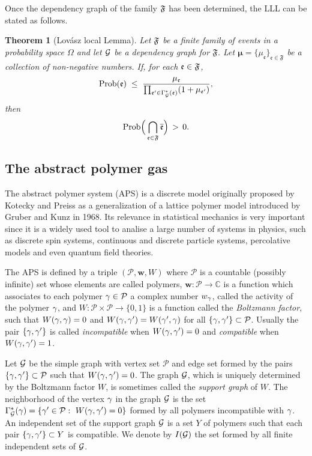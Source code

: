 \documentclass[11pt]{article}
\newtheorem{theo}{Theorem}[section]
\let\m=\mu \let\n=\nu \let\o=\omega    \let\p=\pi \let\ph=\varphi
\let\\=\noindent
\def\ee{\end{equation}}
\def\be{\begin{equation}}
\let\m=\mu \let\n=\nu \let\o=\omega    \let\p=\pi \let\ph=\varphi
\let\\=\noindent
\def\ee{\end{equation}}
\def\be{\begin{equation}}
\def\prob{{\rm Prob}}
\def\ev{{\mathfrak{e}}}
\def\PP{{\mathcal P}}\def\EE{{\mathcal E}}
\def\FF{{\mathfrak{F}}}
\def\GG{{\cal G}}
\def\Om{\Omega}
\begin{document}
\\Once the dependency graph
of the family ${\mathfrak{F}}$  has been determined, the LLL can be stated as follows.



\begin{theo}[Lov\'asz local Lemma]\label{lov}  Let ${\mathfrak{F}}$ be a finite family of events in a probability space  $\Om$ and let  $\GG$ be a dependency graph for  $\FF$.  Let  $\bm{\mu}=\{\mu_\ev\}_{\ev\in \FF}$ be a collection of non-negative numbers. If, for each $\ev\in \fa$,
\begin{equation}
\label{cond}
\prob(\ev)\;\leq\;  {\mu_\ev \over \prod_{\ev'\in \G^*_\GG(\ev)}(1+\m_{\ev'})},
\end{equation}
then
\be\label{thesis}
\prob\Big(\bigcap_{\ev\in \FF}\overline \ev\Big)\,> \,0.
\ee
\end{theo}


\subsection{The abstract polymer gas}

\\The abstract polymer system (APS) is a discrete model originally proposed by Kotecky and Preiss \cite{KP}
as a generalization of a lattice polymer  model introduced by Gruber and Kunz \cite{GK} in 1968. Its relevance in statistical mechanics is very important since it is a widely used  tool to analise a large number of systems in physics, such as discrete spin systems, continuous and discrete
particle systems, percolative models and even quantum field theories.

\\The APS is  defined by a triple $(\PP,\mathbf{w}, W)$ where $\PP$ is a countable (possibly infinite) set whose elements are called polymers, $\mathbf{w} :\PP\to \mathbb{C}$ is a function which associates to each polymer  $\g\in \PP$ a  complex number $w_\gamma$,
called the activity of the polymer $\gamma$, and  $W:\PP\times \PP\to \{0,1\}$ is a  function called the {\it Boltzmann factor}, such that $W(\gamma,\gamma)=0$ and $W(\gamma,\gamma')=W(\gamma',\gamma)$ for all $\{\g,\g'\}\subset \PP$.
Usually the pair $\{\gamma,\gamma'\}$ is  called {\it incompatible} when $W(\gamma,\gamma')=0$ and {\it compatible} when $W(\gamma,\gamma')=1$.

\\Let $\GG$ be the simple graph with vertex set $\PP$ and edge set  formed  by the pairs $\{\g,\g'\}\subset \PP$ such that
$W(\gamma,\gamma')=0$. The graph $\GG$, which is uniquely determined by the Boltzmann factor
$W$, is sometimes called the {\it support graph} of $W$.
The  neighborhood of the vertex $\gamma$ in the graph $\GG$ is the set
$\G^*_\GG(\g)=\{\g'\in \PP: ~W(\g,\g')=0\}$ formed by all polymers incompatible with $\gamma$.
An independent set  of the support graph $\GG$ is    a set $Y$ of polymers  such that each pair $\{\gamma,\gamma'\}\subset Y$ is compatible. We denote by $I(\GG)$ the set formed by all finite independent sets of $\GG$.
\end{document}
